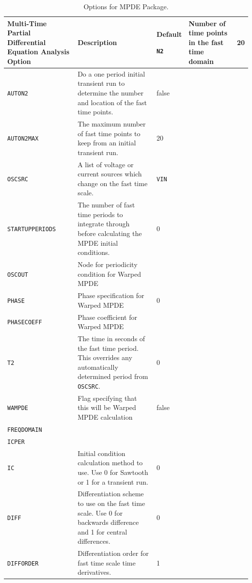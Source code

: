 


\begin{longtable}[htbp]{|>{\setlength{\hsize}{.8\hsize}}Y|
>{\setlength{\hsize}{1.4\hsize}}Y|
>{\setlength{\hsize}{.8\hsize}}Y|} 

\caption{Options for MPDE Package.\label{MPDEPKG}} \\ \hline

\color{white}\textbf{Multi-Time Partial Differential Equation Analysis Option} & \color{white}\bf Description
& \color{white}\bf Default \endhead

\texttt{N2} & Number of time points in the fast time domain & 20\\ \hline
\texttt{AUTON2} & Do a one period initial transient run to determine the number and location of the fast time points.& false \\ \hline
\texttt{AUTON2MAX} & The maximum number of fast time points to keep from an initial transient run. & 20 \\ \hline
\texttt{OSCSRC} & A list of voltage or current sources which change on the fast time scale. & \texttt{VIN} \\ \hline
\texttt{STARTUPPERIODS} & The number of fast time periods to integrate through before calculating the MPDE initial conditions.& 0\\ \hline
\texttt{OSCOUT} & Node for periodicity condition for Warped MPDE & \\ \hline
\texttt{PHASE} & Phase specification for Warped MPDE & 0\\ \hline
\texttt{PHASECOEFF} & Phase coefficient for Warped MPDE & \\ \hline
\texttt{T2} & The time in seconds of the fast time period. This overrides any automatically determined period from \texttt{OSCSRC}.& 0\\ \hline
\texttt{WAMPDE} & Flag specifying that this will be Warped MPDE calculation & false \\ \hline
\texttt{FREQDOMAIN} & & \\ \hline
\texttt{ICPER} & & \\ \hline
\texttt{IC} & Initial condition calculation method to use.  Use 0 for Sawtooth or 1 for a transient run. & 0 \\ \hline
\texttt{DIFF} & Differentiation scheme to use on the fast time scale.  Use 0 for backwards difference and 1 for central differences. & 0\\ \hline
\texttt{DIFFORDER} & Differentiation order for fast time scale time derivatives.& 1 \\ \hline



\end{longtable}

